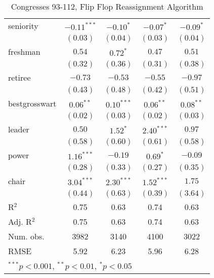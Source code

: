 \documentclass[12pt]{article}
\begin{document}
\begin{table}
\begin{center}
\begin{tabular}{l c c c c }
            seniority              & $-0.11^{***}$ & $-0.10^{*}$   & $-0.07^{*}$   & $-0.09^{*}$   \\
            & $(0.03)$      & $(0.04)$      & $(0.03)$      & $(0.04)$      \\
            freshman               & $0.54$        & $0.72^{*}$    & $0.47$        & $0.51$        \\
            & $(0.32)$      & $(0.36)$      & $(0.31)$      & $(0.38)$      \\
            retiree                & $-0.73$       & $-0.53$       & $-0.55$       & $-0.97$       \\
            & $(0.43)$      & $(0.48)$      & $(0.42)$      & $(0.51)$      \\
            bestgrosswart          & $0.06^{**}$   & $0.10^{***}$  & $0.06^{**}$   & $0.08^{**}$   \\
            & $(0.02)$      & $(0.03)$      & $(0.02)$      & $(0.03)$      \\
            leader                 & $0.50$        & $1.52^{*}$    & $2.40^{***}$  & $0.97$        \\
            & $(0.58)$      & $(0.60)$      & $(0.61)$      & $(0.58)$      \\
            power                  & $1.16^{***}$  & $-0.19$       & $0.69^{*}$    & $-0.09$       \\
            & $(0.28)$      & $(0.33)$      & $(0.27)$      & $(0.35)$      \\
            chair                  & $3.04^{***}$  & $2.30^{***}$  & $1.52^{***}$  & $1.75$        \\
            & $(0.44)$      & $(0.63)$      & $(0.39)$      & $(3.64)$      \\
            \hline
            R$^2$                  & 0.75          & 0.63          & 0.74          & 0.63          \\
            Adj. R$^2$             & 0.75          & 0.63          & 0.74          & 0.63          \\
            Num. obs.              & 3982          & 3140          & 4100          & 3022          \\
            RMSE                   & 5.92          & 6.23          & 5.96          & 6.28          \\
            \hline
            \multicolumn{5}{l}{\scriptsize{$^{***}p<0.001$, $^{**}p<0.01$, $^*p<0.05$}}
		\end{tabular}
		\caption{Congresses 93-112, Flip Flop Reassignment Algorithm}
	\end{center}
\end{table}
\end{document}
